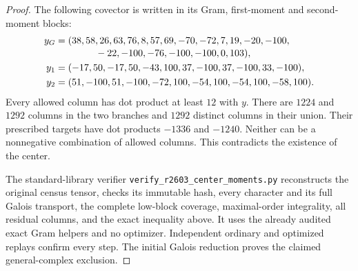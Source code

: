 \begin{proof}
The following covector is written in its Gram, first-moment and
second-moment blocks:
\begin{align*}
 y_G={}&(38,58,26,63,76,8,57,69,-70,-72,7,19,-20,-100,\\[-2pt]
       &\hspace{10mm}-22,-100,-76,-100,-100,0,103),\\
 y_1={}&(-17,50,-17,50,-43,100,37,-100,37,-100,33,-100),\\
 y_2={}&(51,-100,51,-100,-72,100,-54,100,-54,100,-58,100).
\end{align*}
Every allowed column has dot product at least $12$ with $y$.
There are $1224$ and $1292$ columns in the two branches and $1292$
distinct columns in their union. Their prescribed targets have dot
products $-1336$ and $-1240$. Neither can be a nonnegative combination
of allowed columns. This contradicts the existence of the center.

The standard-library verifier
\texttt{verify\_r2603\_center\_moments.py} reconstructs the original
census tensor, checks its immutable hash, every character and its
full Galois transport, the complete low-block coverage, maximal-order
integrality, all residual columns, and the exact inequality above.
It uses the already audited exact Gram helpers and no optimizer.
Independent ordinary and optimized replays confirm every step.
The initial Galois reduction proves the claimed general-complex
exclusion.
\end{proof}
